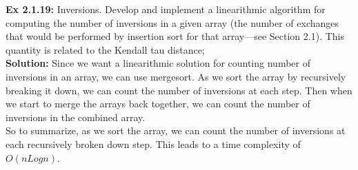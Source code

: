 \documentclass[11pt,fleqn]{article}
\begin{document}
\textbf{Ex 2.1.19:} Inversions. Develop and implement a linearithmic algorithm for computing
the number of inversions in a given array (the number of exchanges that would be
performed by insertion sort for that array—see Section 2.1). This quantity is related
to the Kendall tau distance;\\
	
\textbf{Solution:}
Since we want a linearithmic solution for counting number of inversions in an array, we can use mergesort. As we sort the array by recursively breaking it down, we can count the number of inversions at each step. Then when we start to merge the arrays back together, we can count the number of inversions in the combined array.\\

So to summarize, as we sort the array, we can count the number of inversions at each recursively broken down step. This leads to a time complexity of $O(nLogn)$.
\end{document}
